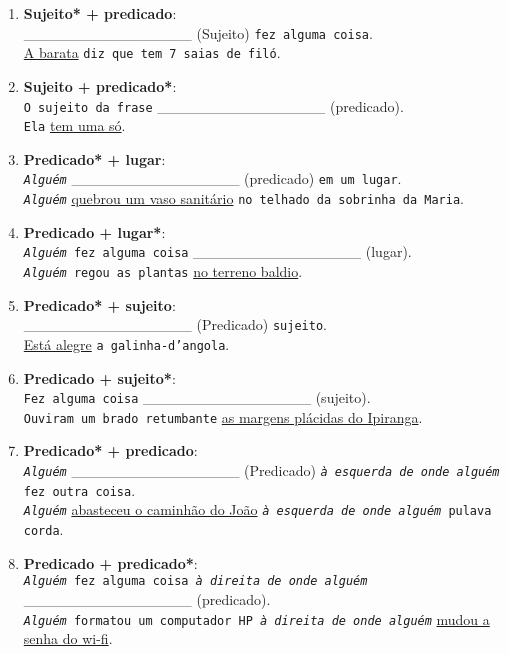 \documentclass[12pt]{article}
\newcommand{\linha}{ \_\_\_\_\_\_\_\_\_\_\_\_\_\_\_\_ }
\newcommand{\tipo}[2]{\bigskip \item\textbf{#1 + #2}: \\}
\begin{document}
\begin{enumerate}
	\tipo{Sujeito*}{predicado} 
		\linha (Sujeito) \texttt{fez alguma coisa}.	
		\\ \underline{A barata} \texttt{diz que tem 7 saias de filó}.
	
	\tipo{Sujeito}{predicado*} 
		\texttt{O sujeito da frase} \linha (predicado).	
		\\ \texttt{Ela} \underline{tem uma só}.
		
	\newpage	
		
	\tipo{Predicado*}{lugar} 
		\texttt{\textit{Alguém}} \linha (predicado) \texttt{em um lugar}.
		\\ \texttt{\textit{Alguém}} \underline{quebrou um vaso sanitário} \texttt{no telhado da sobrinha da Maria}.
	
	\tipo{Predicado}{lugar*} 
		\texttt{\textit{Alguém} fez alguma coisa} \linha (lugar).	
		\\ \texttt{\textit{Alguém} regou as plantas} \underline{no terreno baldio}.
	
	\tipo{Predicado*}{sujeito} 
		\linha (Predicado) \texttt{sujeito}.
		\\ \underline{Está alegre} \texttt{a galinha-d'angola}.
	
	\tipo{Predicado}{sujeito*} 
		\texttt{Fez alguma coisa} \linha (sujeito).	
		\\ \texttt{Ouviram um brado retumbante} \underline{as margens plácidas do Ipiranga}.
	
	\tipo{Predicado*}{predicado} 
		\texttt{\textit{Alguém}} \linha (Predicado) \texttt{\textit{à esquerda de onde alguém} fez outra coisa}.	
		\\ \texttt{\textit{Alguém}} \underline{abasteceu o caminhão do João} \texttt{\textit{à esquerda de onde alguém} pulava corda}.	
	
	\tipo{Predicado}{predicado*} 
		\texttt{\textit{Alguém} fez alguma coisa \textit{à direita de onde alguém}} \linha (predicado).	
		\\ \texttt{\textit{Alguém} formatou um computador HP \textit{à direita de onde alguém}} \underline{mudou a senha do wi-fi}.
	
\end{enumerate}
\end{document}
